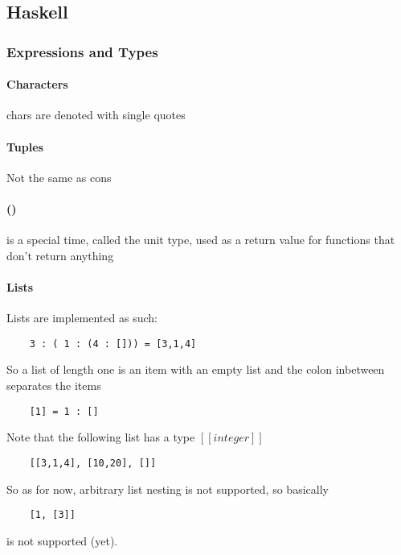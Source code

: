 \documentclass[12pt]{article}
\begin{document}
\subsection{Haskell}

\subsubsection{Expressions and Types}

\paragraph{Characters} chars are denoted with single quotes

\paragraph{Tuples} Not the same as cons

\paragraph{()} is a special time, called the unit type, used as a return value for functions that don't return anything

\paragraph{Lists} Lists are implemented as such:

\begin{lstlisting}
	3 : ( 1 : (4 : [])) = [3,1,4]
\end{lstlisting}

So a list of length one is an item with an empty list and the colon inbetween separates the items
\begin{lstlisting}
	[1] = 1 : []
\end{lstlisting}

Note that the following list has a type $[[integer]]$

\begin{lstlisting}
	[[3,1,4], [10,20], []]
\end{lstlisting}

So as for now, arbitrary list nesting is not supported, so basically

\begin{lstlisting}
	[1, [3]]
\end{lstlisting}

is not supported (yet).
\end{document}
